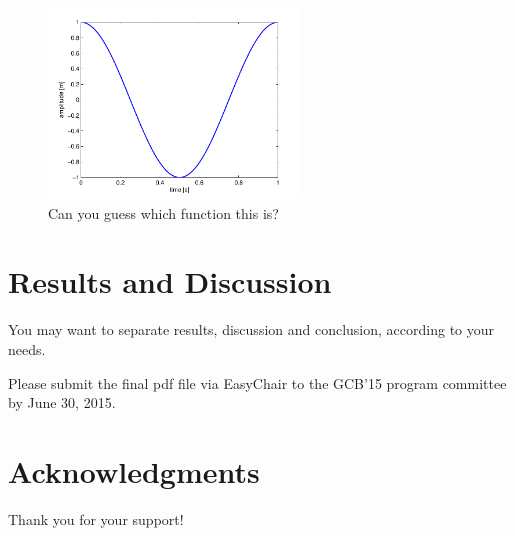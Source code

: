 \documentclass[fleqn,10pt,twoside]{gcb15submission}
\begin{document}
\begin{figure}[ht]\centering
\includegraphics[width=0.6\textwidth]{results}
\caption{Can you guess which function this is?}
\label{fig:results}
\end{figure}



\section*{Results and Discussion}

You may want to separate results, discussion and conclusion, according to your needs.

Please submit the final pdf file via EasyChair to the GCB'15 program committee by June 30, 2015. 


\section*{Acknowledgments}
Thank you for your support!



\end{document}
